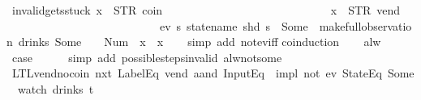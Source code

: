 \begin{isabellebody}
\isamarkupfalse%
\ invalid{\isacharunderscore}gets{\isacharunderscore}stuck{\isacharcolon}\ {\isachardoublequoteopen}x{}\ {\isasymnoteq}\ {\isacharparenleft}STR\ {\isacharprime}{\isacharprime}coin{\isacharprime}{\isacharprime}{\isacharcomma}\ {\isacharbrackleft}{\isacharbrackright}{\isacharparenright}\ {\isasymLongrightarrow}\isanewline
\ \ \ \ \ \ \ \ \ \ \ \ \ \ \ \ \ \ \ \ \ \ \ \ \ \ \ x{}\ {\isasymnoteq}\ {\isacharparenleft}STR\ {\isacharprime}{\isacharprime}vend{\isacharprime}{\isacharprime}{\isacharcomma}\ {\isacharbrackleft}{\isacharbrackright}{\isacharparenright}\ {\isasymLongrightarrow}\isanewline
\ \ \ \ \ \ \ \ \ \ \ \ \ \ \ \ \ \ \ \ \ \ \ \ \ \ \ {\isasymnot}ev\ {\isacharparenleft}{\isasymlambda}s{\isachardot}\ statename\ {\isacharparenleft}shd\ s{\isacharparenright}\ {\isacharequal}\ Some\ {}{\isacharparenright}\ {\isacharparenleft}make{\isacharunderscore}full{\isacharunderscore}observation\ drinks\ {\isacharparenleft}Some\ {}{\isacharparenright}\ {\isacharless}{}\ {\isacharcolon}{\isacharequal}\ Num\ {}{\isachargreater}\ {\isacharparenleft}x{}\ {\isacharhash}{\isacharhash}\ x{}{\isacharparenright}{\isacharparenright}{\isachardoublequoteclose}\isanewline
%
\isadelimproof
\ \ %
\endisadelimproof
%
\isatagproof
{}\isamarkupfalse%
\ {\isacharparenleft}simp\ add{\isacharcolon}\ not{\isacharunderscore}ev{\isacharunderscore}iff{\isacharparenright}\isanewline
{}\isamarkupfalse%
{\isacharparenleft}coinduction{\isacharparenright}\isanewline
\ \ \isamarkupfalse%
\ alw\isanewline
\ \ \isamarkupfalse%
\ \isamarkupfalse%
\ {\isacharquery}case\isanewline
\ \ \ \ \isamarkupfalse%
\ {\isacharparenleft}simp\ add{\isacharcolon}\ possible{\isacharunderscore}steps{\isacharunderscore}{}{\isacharunderscore}invalid\ alw{\isacharunderscore}not{\isacharunderscore}some{\isacharparenright}\isanewline
{}\isamarkupfalse%
%
\endisatagproof
{\isafoldproof}%
%
\isadelimproof
\isanewline
%
\endisadelimproof
\isanewline
{}\isamarkupfalse%
\ LTL{\isacharunderscore}vend{\isacharunderscore}no{\isacharunderscore}coin{\isacharcolon}\ {\isachardoublequoteopen}{\isacharparenleft}{\isacharparenleft}nxt\ {\isacharparenleft}LabelEq\ {\isacharprime}{\isacharprime}vend{\isacharprime}{\isacharprime}\ aand\ InputEq\ {\isacharbrackleft}{\isacharbrackright}{\isacharparenright}{\isacharparenright}\ impl\ not\ {\isacharparenleft}ev\ {\isacharparenleft}StateEq\ {\isacharparenleft}Some\ {}{\isacharparenright}{\isacharparenright}{\isacharparenright}{\isacharparenright}\ {\isacharparenleft}watch\ drinks\ t{\isacharparenright}{\isachardoublequoteclose}\isanewline

\end{isabellebody}
